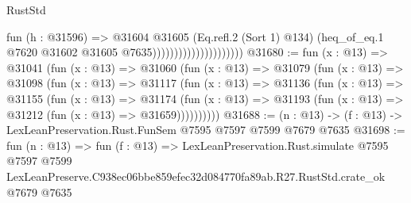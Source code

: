 \begin{lexlean}{RustStd}
\begin{coremodule}
                                          fun (h : @31596) =>
                                          @31604
                                            @31605
                                            (Eq.refl.{2} (Sort 1) @134)
                                            (heq_of_eq.{1}
                                              @7620
                                              @31602
                                              @31605
                                              @7635)))))))))))))))))))))
@31680 := fun (x : @13) =>
  @31041
    (fun (x : @13) =>
    @31060
      (fun (x : @13) =>
      @31079
        (fun (x : @13) =>
        @31098
          (fun (x : @13) =>
          @31117
            (fun (x : @13) =>
            @31136
              (fun (x : @13) =>
              @31155
                (fun (x : @13) =>
                @31174
                  (fun (x : @13) =>
                  @31193 (fun (x : @13) => @31212 (fun (x : @13) => @31659))))))))))
@31688 := (n : @13) -> (f : @13) -> LexLeanPreservation.Rust.FunSem @7595 @7597 @7599 @7679 @7635
@31698 := fun (n : @13) =>
  fun (f : @13) =>
  LexLeanPreservation.Rust.simulate
    @7595
    @7597
    @7599
    LexLeanPreserve.C938ec06bbe859efec32d084770fa89ab.R27.RustStd.crate_ok
    @7679
    @7635
\end{coremodule}
\end{lexlean}
